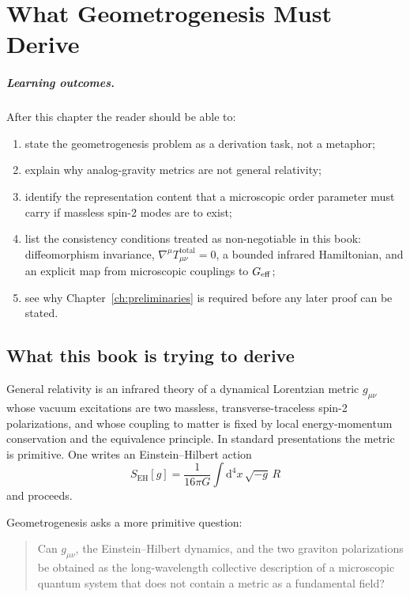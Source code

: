 \chapter[What Geometrogenesis Must Derive]{What Geometrogenesis Must Derive}
\label{ch:geometrogenesis}

\paragraph{Learning outcomes.}
After this chapter the reader should be able to:
\begin{enumerate}
  \item state the geometrogenesis problem as a derivation task,
        not a metaphor;
  \item explain why analog-gravity metrics are not general relativity;
  \item identify the representation content that a microscopic order
        parameter must carry if massless spin-2 modes are to exist;
  \item list the consistency conditions treated as non-negotiable in
        this book: diffeomorphism invariance,
        \(\nabla^\mu T_{\mu\nu}^{\mathrm{total}}=0\), a bounded
        infrared Hamiltonian, and an explicit map from microscopic
        couplings to \(G_{\mathrm{eff}}\);
  \item see why Chapter~\ref{ch:preliminaries} is required before any
        later proof can be stated.
\end{enumerate}

\section{What this book is trying to derive}
\label{sec:ch1-goal}

General relativity is an infrared theory of a dynamical Lorentzian
metric \(g_{\mu\nu}\) whose vacuum excitations are two massless,
transverse-traceless spin-2 polarizations, and whose coupling to matter
is fixed by local energy-momentum conservation and the equivalence
principle. In standard presentations the metric is primitive. One writes
an Einstein--Hilbert action
\begin{equation}
  \label{eq:EH}
  S_{\mathrm{EH}}[g]
  =\frac{1}{16\pi G}\int\mathrm{d}^4x\,\sqrt{-g}\,R
\end{equation}
and proceeds.

Geometrogenesis asks a more primitive question:

\begin{quote}
Can \(g_{\mu\nu}\), the Einstein--Hilbert dynamics, and the two graviton
polarizations be obtained as the long-wavelength collective description
of a microscopic quantum system that does not contain a metric as a
fundamental field?
\end{quote}

